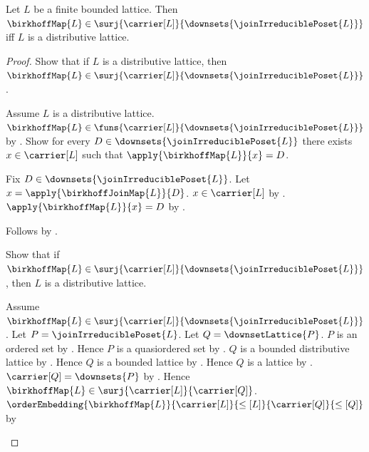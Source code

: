 \begin{theorem}\label{birkhoff_map_surjective_iff_distributive}
    Let $L$ be a finite bounded lattice.
    Then $\birkhoffMap{L}\in
        \surj{\carrier[L]}{\downsets{\joinIrreduciblePoset{L}}}$ iff
        $L$ is a distributive lattice.
\end{theorem}
\begin{proof}
    Show that if $L$ is a distributive lattice, then
        $\birkhoffMap{L}\in
            \surj{\carrier[L]}{\downsets{\joinIrreduciblePoset{L}}}$.
    \begin{subproof}
        Assume $L$ is a distributive lattice.
        $\birkhoffMap{L}\in
            \funs{\carrier[L]}{\downsets{\joinIrreduciblePoset{L}}}$ by
            .
        Show for every $D\in\downsets{\joinIrreduciblePoset{L}}$
            there exists $x\in\carrier[L]$ such that
                $\apply{\birkhoffMap{L}}{x}=D$.
        \begin{subproof}
            Fix $D\in\downsets{\joinIrreduciblePoset{L}}$.
            Let $x=\apply{\birkhoffJoinMap{L}}{D}$.
            $x\in\carrier[L]$ by
                .
            $\apply{\birkhoffMap{L}}{x}=D$ by
                .
        \end{subproof}
        Follows by .
    \end{subproof}
    Show that if $\birkhoffMap{L}\in
        \surj{\carrier[L]}{\downsets{\joinIrreduciblePoset{L}}}$, then
        $L$ is a distributive lattice.
    \begin{subproof}
        Assume $\birkhoffMap{L}\in
            \surj{\carrier[L]}{\downsets{\joinIrreduciblePoset{L}}}$.
        Let $P=\joinIrreduciblePoset{L}$.
        Let $Q=\downsetLattice{P}$.
        $P$ is an ordered set by
            .
        Hence $P$ is a quasiordered set by
            .
        $Q$ is a bounded distributive lattice by
            .
        Hence $Q$ is a bounded lattice by
            .
        Hence $Q$ is a lattice by .
        $\carrier[Q]=\downsets{P}$ by
            .
        Hence $\birkhoffMap{L}\in
            \surj{\carrier[L]}{\carrier[Q]}$.
        $\orderEmbedding
            {\birkhoffMap{L}}
            {\carrier[L]}{\leq[L]}
            {\carrier[Q]}{\leq[Q]}$ by

\end{subproof}
\end{proof}
